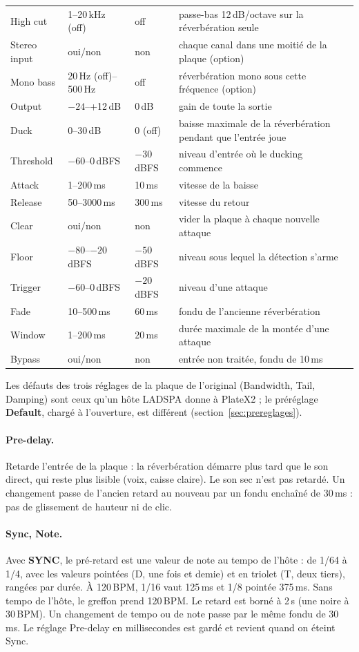 \documentclass[a4paper,11pt]{article}
\newcommand{\ctl}[1]{\textsf{\textbf{#1}}}   %
\newcommand{\dB}{\,dB}
\newcommand{\dBFS}{\,dBFS}
\begin{document}
\begin{center}
\begin{tabularx}{\textwidth}{@{}l l l X@{}}
High cut & 1--20\,kHz (off) & off & passe-bas 12\dB/octave sur la réverbération seule \\
Stereo input & oui/non & non & chaque canal dans une moitié de la plaque (option) \\
Mono bass & 20\,Hz (off)--500\,Hz & off & réverbération mono sous cette fréquence (option) \\
Output & $-24$--+12\dB & 0\dB & gain de toute la sortie \\
Duck & 0--30\dB & 0 (off) & baisse maximale de la réverbération pendant que l'entrée joue \\
Threshold & $-60$--0\dBFS & $-30$\dBFS & niveau d'entrée où le ducking commence \\
Attack & 1--200\,ms & 10\,ms & vitesse de la baisse \\
Release & 50--3000\,ms & 300\,ms & vitesse du retour \\
Clear & oui/non & non & vider la plaque à chaque nouvelle attaque \\
Floor & $-80$--$-20$\dBFS & $-50$\dBFS & niveau sous lequel la détection s'arme \\
Trigger & $-60$--0\dBFS & $-20$\dBFS & niveau d'une attaque \\
Fade & 10--500\,ms & 60\,ms & fondu de l'ancienne réverbération \\
Window & 1--200\,ms & 20\,ms & durée maximale de la montée d'une attaque \\
Bypass & oui/non & non & entrée non traitée, fondu de 10\,ms \\
\bottomrule
\end{tabularx}
\end{center}
Les défauts des trois réglages de la plaque de l'original (Bandwidth, Tail, Damping) sont ceux
qu'un hôte LADSPA donne à PlateX2 ; le préréglage \ctl{Default}, chargé à l'ouverture, est différent
(section~\ref{sec:prereglages}).

\paragraph{Pre-delay.} Retarde l'entrée de la plaque : la réverbération démarre plus tard que le
son direct, qui reste plus lisible (voix, caisse claire). Le son sec n'est pas retardé. Un
changement passe de l'ancien retard au nouveau par un fondu enchaîné de 30\,ms : pas de
glissement de hauteur ni de clic.

\paragraph{Sync, Note.} Avec \ctl{SYNC}, le pré-retard est une valeur de note au tempo de
l'hôte : de 1/64 à 1/4, avec les valeurs pointées (D, une fois et demie) et en triolet (T, deux
tiers), rangées par durée. À 120\,BPM, 1/16 vaut 125\,ms et 1/8 pointée 375\,ms. Sans tempo de
l'hôte, le greffon prend 120\,BPM. Le retard est borné à 2\,s (une noire à 30\,BPM). Un
changement de tempo ou de note passe par le même fondu de 30\,ms. Le réglage Pre-delay en
millisecondes est gardé et revient quand on éteint Sync.
\end{document}
